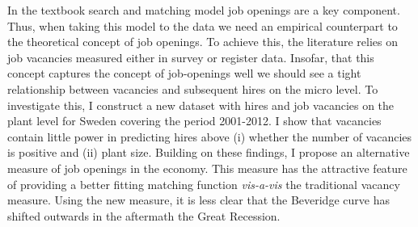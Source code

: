 In the textbook search and matching model job openings are a key component. Thus, when taking this model to the data we need an empirical counterpart to the theoretical concept of job openings. To achieve this, the literature relies on job vacancies measured either in survey or register data. Insofar, that this concept captures the concept of job-openings well we should see a tight relationship between vacancies and subsequent hires on the micro level. To investigate this, I construct a new dataset with hires and job vacancies on the plant level for Sweden covering the period 2001-2012. I show that vacancies contain little power in predicting hires above (i) whether the number of vacancies is positive and (ii) plant size. Building on these findings, I propose an alternative measure of job openings in the economy. This measure has the attractive feature of providing a better fitting matching function \emph{vis-a-vis} the traditional vacancy measure. Using the new measure, it is less clear that the Beveridge curve has shifted outwards in the aftermath the Great Recession.

